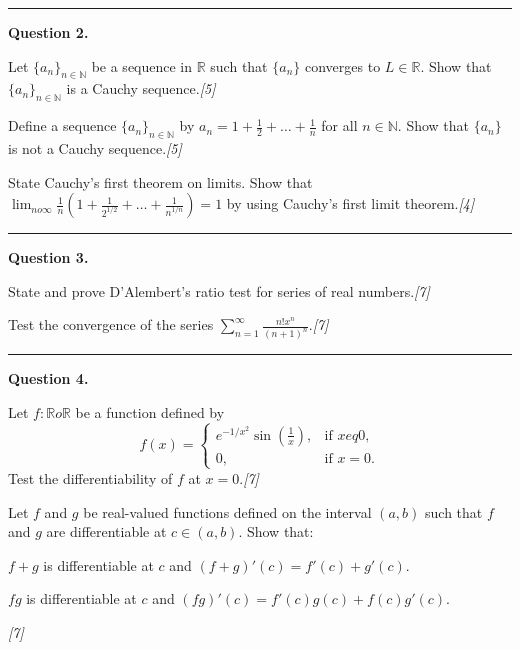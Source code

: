 \documentclass[11pt,a4paper]{article}
\newcommand{\pts}[1]{\hfill   \textit{[#1]}}
\begin{document}
{\medskip\rule{\linewidth}{0.2pt}\medskip




\noindent   \textbf{Question 2.}

\begin{parts}
  \item Let $\{a_n\}_{n \in \mathbb{N}}$ be a sequence in $\mathbb{R}$ such that $\{a_n\}$ converges to $L \in \mathbb{R}$. Show that $\{a_n\}_{n \in \mathbb{N}}$ is a Cauchy sequence.\pts{5}
  \item Define a sequence $\{a_n\}_{n \in \mathbb{N}}$ by $a_n = 1 + \frac{1}{2} + \dots + \frac{1}{n}$ for all $n \in \mathbb{N}$. Show that $\{a_n\}$ is not a Cauchy sequence.\pts{5}
  \item State Cauchy's first theorem on limits. Show that $\lim_{n  o \infty} \frac{1}{n} \left( 1 + \frac{1}{2^{1/2}} + \dots + \frac{1}{n^{1/n}} \right) = 1$ by using Cauchy's first limit theorem.\pts{4}
\end{parts}

\medskip\rule{\linewidth}{0.2pt}\medskip




\noindent   \textbf{Question 3.}

\begin{parts}
  \item State and prove D'Alembert's ratio test for series of real numbers.\pts{7}
  \item Test the convergence of the series $\sum_{n=1}^\infty \frac{n! x^n}{(n+1)^n}$.\pts{7}
\end{parts}

\medskip\rule{\linewidth}{0.2pt}\medskip




\noindent   \textbf{Question 4.}

\begin{parts}
  \item Let $f \colon \mathbb{R}  o \mathbb{R}$ be a function defined by
  \[
    f(x) = 
\begin{cases} e^{-1/x^2} \sin\left(\frac{1}{x}\right), &  \text{if } x 
eq 0, \\ 0, &  \text{if } x = 0. \end{cases}
  \]
  Test the differentiability of $f$ at $x = 0$.\pts{7}
  \item Let $f$ and $g$ be real-valued functions defined on the interval $(a, b)$ such that $f$ and $g$ are differentiable at $c \in (a, b)$. Show that:
  
\begin{parts}
    \item $f + g$ is differentiable at $c$ and $(f+g)'(c) = f'(c) + g'(c)$.
    \item $fg$ is differentiable at $c$ and $(fg)'(c) = f'(c)g(c) + f(c)g'(c)$.
  \end{parts}\pts{7}
\end{parts}

}
\end{document}

